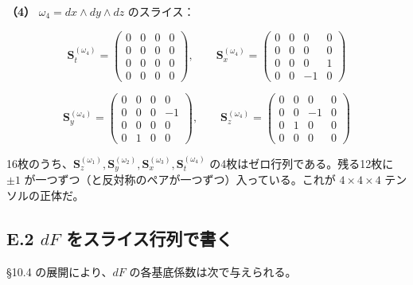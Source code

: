 \documentclass[a4paper,12pt,openany]{book}
\begin{document}
\textbf{（4）} \(\omega_4 = dx\wedge dy\wedge dz\) のスライス：

\[
\mathbf{S}_{t}^{(\omega_4)}=\begin{pmatrix}0&0&0&0\\[2pt]0&0&0&0\\[2pt]0&0&0&0\\[2pt]0&0&0&0\end{pmatrix},\qquad
\mathbf{S}_{x}^{(\omega_4)}=\begin{pmatrix}0&0&0&0\\[2pt]0&0&0&0\\[2pt]0&0&0&1\\[2pt]0&0&-1&0\end{pmatrix}
\]

\[
\mathbf{S}_{y}^{(\omega_4)}=\begin{pmatrix}0&0&0&0\\[2pt]0&0&0&-1\\[2pt]0&0&0&0\\[2pt]0&1&0&0\end{pmatrix},\qquad
\mathbf{S}_{z}^{(\omega_4)}=\begin{pmatrix}0&0&0&0\\[2pt]0&0&-1&0\\[2pt]0&1&0&0\\[2pt]0&0&0&0\end{pmatrix}
\]

16枚のうち、\(\mathbf{S}_{z}^{(\omega_1)}, \mathbf{S}_{y}^{(\omega_2)}, \mathbf{S}_{x}^{(\omega_3)}, \mathbf{S}_{t}^{(\omega_4)}\)
の4枚はゼロ行列である。残る12枚に \(\pm1\)
が一つずつ（と反対称のペアが一つずつ）入っている。これが
\(4\times4\times4\) テンソルの正体だ。

\hypertarget{e.2-df-ux3092ux30b9ux30e9ux30a4ux30b9ux884cux5217ux3067ux66f8ux304f}{%
\subsection*{\texorpdfstring{E.2 \(dF\)
をスライス行列で書く}{E.2 dF をスライス行列で書く}}\label{e.2-df-ux3092ux30b9ux30e9ux30a4ux30b9ux884cux5217ux3067ux66f8ux304f}}

§10.4 の展開により、\(dF\) の各基底係数は次で与えられる。
\end{document}
